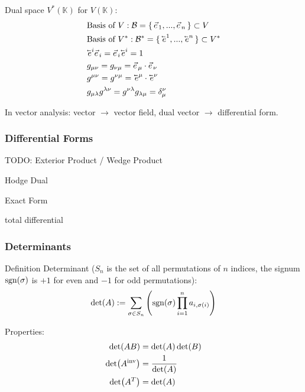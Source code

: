 			\noindent
			Dual space $V^{*}(\mathbb{K})$ for $V(\mathbb{K})$:
			\begin{equation}
				\begin{aligned}
					&\text{Basis of $V$}: \mathcal{B} = \set{ \vec{e}_1,...,\vec{e}_n } \subset V \\
					&\text{Basis of $V^{*}$}: \mathcal{B}^{*} = \set{ \cev{e}^1,...,\cev{e}^n } \subset V^{*} \\
					&\cev{e}^i \vec{e}_i = \vec{e}_i \cev{e}^i = 1 \\
					&g_{\mu\nu} = g_{\nu\mu} = \vec{e}_\mu\cdot\vec{e}_\nu\\
					&g^{\mu\nu} = g^{\nu\mu} = \cev{e}^\mu\cdot\cev{e}^\nu \\
					&g_{\mu\lambda} g^{\lambda\nu} = g^{\nu\lambda}g_{\lambda\mu} = \delta_\mu^\nu \\
				\end{aligned}
			\end{equation}

			In vector analysis: vector $\rightarrow$ vector field, dual vector $\rightarrow$ differential form.

		\subsubsection{Differential Forms}
			TODO:
			Exterior Product / Wedge Product

			Hodge Dual

			Exact Form

			total differential



		\subsubsection{Determinants}
			Definition Determinant ($S_n$ is the set of all permutations of $n$ indices, the signum $\mathrm{sgn}(\sigma)$ is $+1$ for even and $-1$ for odd permutations):
			\begin{equation}
				\det(A) := \sum_{\sigma\in S_n}\qty(\mathrm{sgn}(\sigma)\prod_{i=1}^{n} a_{i,\sigma(i)})
			\end{equation}

			\noindent
			Properties:
			\begin{equation}
				\begin{aligned}
					\det(AB) &= \det(A)\det(B) \\
					\det({A}^\mathrm{inv}) &= \frac{1}{\det(A)} \\
					\det(A^T) &= \det(A) \\
				\end{aligned}
			\end{equation}

